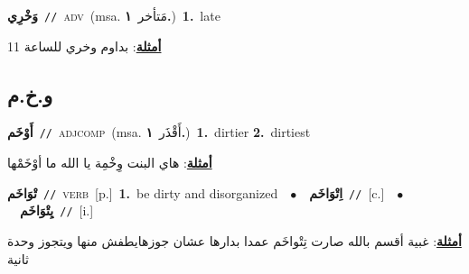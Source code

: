 \documentclass[10pt,a4paper,twoside]{article} %
\begin{document}
\begin{multicols}{2}
{\setlength\topsep{0pt}\textbf{\foreignlanguage{arabic}{وَخْرِي}}\ {\color{gray}\texttt{//}\color{black}}\ \textsc{adv}\ \color{gray}(msa. \foreignlanguage{arabic}{مَتأخر}~\foreignlanguage{arabic}{\textbf{١.}})\color{black}\ \textbf{1.}~late\  \begin{flushright}\color{gray}\foreignlanguage{arabic}{\textbf{\underline{\foreignlanguage{arabic}{أمثلة}}}: بداوم وخري للساعة 11}\end{flushright}\color{black}} \vspace{2mm}

\vspace{-3mm}
\subsection*{\color{blue}\foreignlanguage{arabic}{و.خ.م}\color{blue}{}} 

{\setlength\topsep{0pt}\textbf{\foreignlanguage{arabic}{أَوْخَم}}\ {\color{gray}\texttt{//}\color{black}}\ \textsc{adj\textunderscore comp}\ \color{gray}(msa. \foreignlanguage{arabic}{أَقْذَر}~\foreignlanguage{arabic}{\textbf{١.}})\color{black}\ \textbf{1.}~dirtier  \textbf{2.}~dirtiest\  \begin{flushright}\color{gray}\foreignlanguage{arabic}{\textbf{\underline{\foreignlanguage{arabic}{أمثلة}}}: هاي البنت وِخْمِة يا الله ما أوْخَمْها}\end{flushright}\color{black}} \vspace{2mm}

{\setlength\topsep{0pt}\textbf{\foreignlanguage{arabic}{تْوَاخَم}}\ {\color{gray}\texttt{//}\color{black}}\ \textsc{verb}\ [p.]\ \textbf{1.}~be dirty and disorganized\ \ $\bullet$\ \ \setlength\topsep{0pt}\textbf{\foreignlanguage{arabic}{اِتْوَاخَم}}\ {\color{gray}\texttt{//}\color{black}}\ [c.]\ \ $\bullet$\ \ \setlength\topsep{0pt}\textbf{\foreignlanguage{arabic}{يِتْوَاخَم}}\ {\color{gray}\texttt{//}\color{black}}\ [i.]\  \begin{flushright}\color{gray}\foreignlanguage{arabic}{\textbf{\underline{\foreignlanguage{arabic}{أمثلة}}}: غبية أقسم بالله صارت تِتْواخَم عمدا بدارها عشان جوزهايطفش منها ويتجوز وحدة ثانية}\end{flushright}\color{black}} \vspace{2mm}


\end{multicols}
\end{document}
